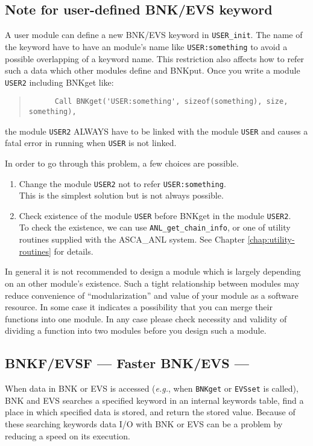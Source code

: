 \subsection*{Note for user-defined BNK/EVS keyword}
A user module can define a new BNK/EVS keyword in {\tt USER\_init}.
The name of the keyword have to have an module's name like {\tt USER:something}
to avoid a possible overlapping of a keyword name.
This restriction also affects how to refer such a data
which other modules define and BNKput.
Once you write a module {\tt USER2} including BNKget like:
\begin{quote}\baselineskip 3.2mm\begin{verbatim}
      Call BNKget('USER:something', sizeof(something), size, something),
\end{verbatim}\end{quote}
the module {\tt USER2} ALWAYS have to be linked with the module
{\tt USER} and causes a fatal error in running when {\tt USER} is not linked.

In order to go through this problem,
a few choices are possible.
\begin{enumerate}
\item Change the module {\tt USER2} not to refer {\tt USER:something}.\\
      This is the simplest solution but is not always possible.
\item Check existence of the module {\tt USER}
      before BNKget in the module {\tt USER2}.\\
      To check the existence,
      we can use {\tt ANL\_get\_chain\_info},
      or one of utility routines supplied with the ASCA\_ANL system.
      See Chapter \ref{chap:utility-routines} for details.
\end{enumerate}

In general
it is not recommended to design a module
which is largely depending on an other module's existence.
Such a tight relationship between modules
may reduce convenience of ``modularization''
and value of your module as a software resource.
In some case
it indicates a possibility that you can merge their functions into one module.
In any case
please check necessity and validity of dividing a function into two modules
before you design such a module.

\subsection{BNKF/EVSF --- Faster BNK/EVS ---}
When data in BNK or EVS is accessed
({\em e.g.}, when {\tt BNKget} or {\tt EVSset} is called),
BNK and EVS searches a specified keyword in an internal keywords table,
find a place in which specified data is stored,
and return the stored value.
Because of these searching keywords
data I/O with BNK or EVS can be a problem by reducing a speed on its execution.

